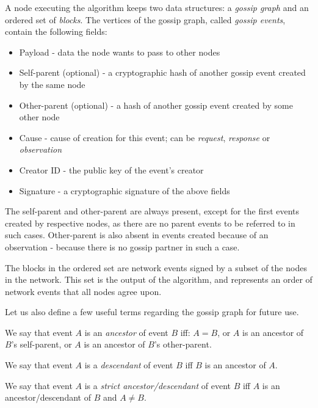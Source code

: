 \documentclass[a4paper,fleqn]{article}
\begin{document}
A node executing the algorithm keeps two data structures: a \emph{gossip graph} and an
ordered set of \emph{blocks}. The vertices of the gossip graph, called \emph{gossip events},
contain the following fields:

\begin{itemize}
		\item Payload - data the node wants to pass to other nodes
		\item Self-parent (optional) - a cryptographic hash of another gossip event created by the
			same node
		\item Other-parent (optional) - a hash of another gossip event created by some other node
		\item Cause - cause of creation for this event; can be \emph{request}, \emph{response} or
			\emph{observation}
		\item Creator ID - the public key of the event's creator
		\item Signature - a cryptographic signature of the above fields
\end{itemize}

The self-parent and other-parent are always present, except for the first events created by
respective nodes, as there are no parent events to be referred to in such cases. Other-parent is
also absent in events created because of an observation - because there is no gossip partner in
such a case.

The blocks in the ordered set are network events signed by a subset of the nodes in the network.
This set is the output of the algorithm, and represents an order of network events that all nodes
agree upon.

Let us also define a few useful terms regarding the gossip graph for future use.

\begin{defn}
	We say that event $A$ is an \emph{ancestor} of event $B$ iff: $A = B$, or $A$ is an ancestor of
	$B$'s self-parent, or $A$ is an ancestor of $B$'s other-parent.
\end{defn}

\begin{defn}
	We say that event $A$ is a \emph{descendant} of event $B$ iff $B$ is an ancestor of $A$.
\end{defn}

\begin{defn}
	We say that event $A$ is a \emph{strict ancestor/descendant} of event $B$ iff $A$ is an
	ancestor/descendant of $B$ and $A \neq B$.
\end{defn}
\end{document}
